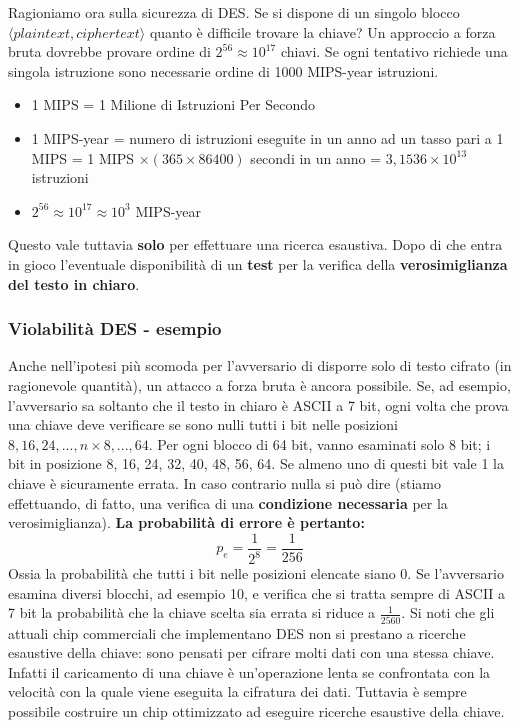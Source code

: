 Ragioniamo ora sulla sicurezza di DES. Se si dispone di un singolo blocco $\langle plaintext,ciphertext \rangle$ quanto è difficile trovare la chiave? Un approccio a forza bruta dovrebbe provare ordine di $2^{56} \approx 10^{17}$ chiavi. Se ogni tentativo richiede una singola istruzione sono necessarie ordine di 1000 MIPS-year istruzioni.
\begin{itemize}
  \item 1 MIPS = 1 Milione di Istruzioni Per Secondo
  \item 1 MIPS-year = numero di istruzioni eseguite in un anno ad un tasso pari a 1 MIPS = 1 MIPS $\times(365 \times 86400)$ secondi in un anno = $3,1536 \times 10^{13}$ istruzioni
  \item $2^{56} \approx 10^{17} \approx 10^{3}$ MIPS-year
\end{itemize}
Questo vale tuttavia \textbf{solo} per effettuare una ricerca esaustiva. Dopo di che entra in gioco l'eventuale disponibilità di un \textbf{test} per la verifica della \textbf{verosimiglianza del testo in chiaro}.

\subsubsection{Violabilità DES - esempio}
Anche nell'ipotesi più scomoda per l'avversario di disporre solo di testo cifrato (in ragionevole quantità), un attacco a forza bruta è ancora possibile. Se, ad esempio, l'avversario sa soltanto che il testo in chiaro è ASCII a 7 bit, ogni volta che prova una chiave deve verificare se sono nulli tutti i bit nelle posizioni $8, 16, 24, ..., n \times 8, ..., 64$. Per ogni blocco di 64 bit, vanno esaminati solo 8 bit; i bit in posizione 8, 16, 24, 32, 40, 48, 56, 64. Se almeno uno di questi bit vale 1 la chiave è sicuramente errata. In caso contrario nulla si può dire (stiamo effettuando, di fatto, una verifica di una \textbf{condizione necessaria} per la verosimiglianza). \textbf{La probabilità di errore è pertanto:}
\[
p_e = \frac{1}{2^8} = \frac{1}{256}
\]
Ossia la probabilità che tutti i bit nelle posizioni elencate siano 0. Se l'avversario esamina diversi blocchi, ad esempio 10, e verifica che si tratta sempre di ASCII a 7 bit la probabilità che la chiave scelta sia errata si riduce a $\frac{1}{2560}$. Si noti che gli attuali chip commerciali che implementano DES non si prestano a ricerche esaustive della chiave: sono pensati per cifrare molti dati con una stessa chiave. Infatti il caricamento di una chiave è un'operazione lenta se confrontata con la velocità con la quale viene eseguita la cifratura dei dati. Tuttavia è sempre possibile costruire un chip ottimizzato ad eseguire ricerche esaustive della chiave.


